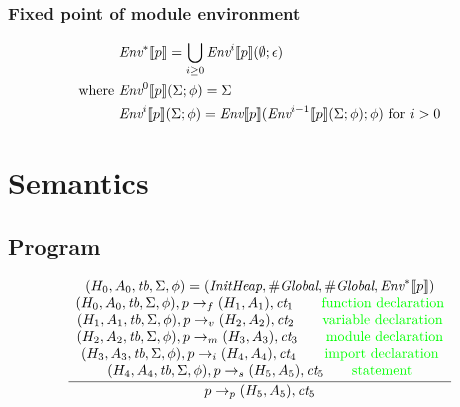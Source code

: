 \documentclass[a4paper]{article}
\newcommand{\comment}[1]{\mbox{\textcolor{green}{#1}}}
\newcommand{\Env}{\emph{Env}}
\newcommand{\Where}{\mbox{where}}
\newcommand{\tb}{\emph{tb}}
\newcommand{\ct}{\emph{ct}}
\begin{document}
\subsubsection{Fixed point of module environment}

\begin{equation*}
\begin{split}
& \Env^* \llbracket p \rrbracket = \bigcup_{i \ge 0} \Env^i \llbracket p \rrbracket (\emptyset; \epsilon) \\
\Where\ & \Env^0 \llbracket p \rrbracket (\Sigma; \phi) = \Sigma \\
& \Env^i \llbracket p \rrbracket (\Sigma; \phi) = \Env \llbracket p \rrbracket (\Env^{i-1} \llbracket p \rrbracket (\Sigma; \phi); \phi)\ \mbox{for}\ i > 0 \\
\end{split}
\end{equation*}

\section{Semantics}

\subsection{Program}

\begin{equation*}
\frac{
    \begin{array}{c}
    (H_0, A_0, \tb, \Sigma, \phi) = (\emph{InitHeap}, \#\emph{Global}, \#\emph{Global}, \Env^* \llbracket p \rrbracket) \\
    (H_0, A_0, \tb, \Sigma, \phi), p \rightarrow_f (H_1, A_1), \ct_1 \qquad \comment{function declaration} \\
    (H_1, A_1, \tb, \Sigma, \phi), p \rightarrow_v (H_2, A_2), \ct_2 \qquad \comment{variable declaration} \\
    (H_2, A_2, \tb, \Sigma, \phi), p \rightarrow_m (H_3, A_3), \ct_3 \qquad \comment{module declaration} \\
    (H_3, A_3, \tb, \Sigma, \phi), p \rightarrow_i (H_4, A_4), \ct_4 \qquad \comment{import declaration} \\
    (H_4, A_4, \tb, \Sigma, \phi), p \rightarrow_s (H_5, A_5), \ct_5 \qquad \comment{statement} \\
    \end{array}
}{
    p \rightarrow_p (H_5, A_5), \ct_5
}
\end{equation*}
\end{document}
